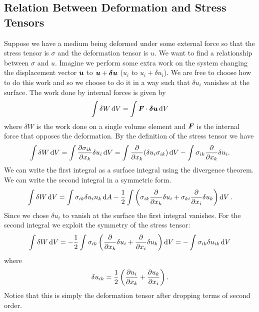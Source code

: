 \documentclass[a4paper]{article}
\begin{document}
    \subsection{Relation Between Deformation and Stress Tensors}
    Suppose we have a medium being deformed under some external force so that the stress tensor is \(\sigma\) and the deformation tensor is \(u\).
    We want to find a relationship between \(\sigma\) and \(u\).
    Imagine we perform some extra work on the system changing the displacement vector \(\bm{u}\) to \(\bm{u} + \bm{\delta u}\) (\(u_i\) to \(u_i + \delta u_i\)).
    We are free to choose how to do this work and so we choose to do it in a way such that \(\delta u_i\) vanishes at the surface.
    The work done by internal forces is given by
    \[\int \delta W\dd{V} = \int \bm{F}\cdot\bm{\delta u}\dd{V}\]
    where \(\delta W\) is the work done on a single volume element and \(\bm{F}\) is the internal force that opposes the deformation.
    By the definition of the stress tensor we have
    \[\int \delta W \dd{V} = \int \pdv{\sigma_{ik}}{x_k}\delta u_i \dd{V} = \int \pdv{x_k}(\delta u_i \sigma_{ik}) \dd{V} - \int \sigma_{ik}\pdv{x_k}\delta u_i.\]
    We can write the first integral as a surface integral using the divergence theorem.
    We can write the second integral in a symmetric form.
    \[\int \delta W \dd{V} = \int \sigma_{ik}\delta u_i n_k \dd{A} - \frac{1}{2} \int \left( \sigma_{ik}\pdv{x_k}\delta u_i + \sigma_{ki}\pdv{x_i}\delta u_k \right)\dd{V}.\]
    Since we chose \(\delta u_i\) to vanish at the surface the first integral vanishes.
    For the second integral we exploit the symmetry of the stress tensor:
    \[\int \delta W \dd{V} = -\frac{1}{2}\int \sigma_{ik}\left( \pdv{x_k}\delta u_i + \pdv{x_i}\delta u_k \right) \dd{V} = -\int \sigma_{ik}\delta u_{ik} \dd{V}\]
    where
    \[\delta u_{ik} = \frac{1}{2}\left( \pdv{u_i}{x_k} + \pdv{u_k}{x_i} \right).\]
    Notice that this is simply the deformation tensor after dropping terms of second order.
    
\end{document}

